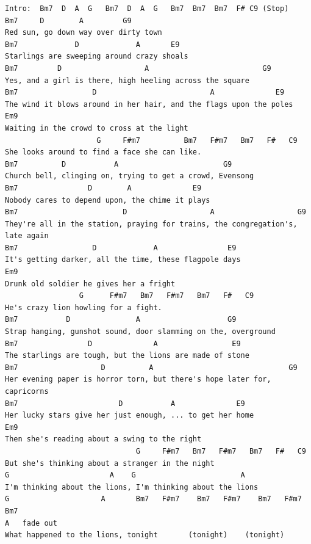 \documentclass[a4paper]{article}
\begin{document}
\begin{Verbatim}[commandchars=\\\{\}]
Intro:  Bm7  D  A  G   Bm7  D  A  G   Bm7  Bm7  Bm7  F# C9 (Stop) 
Bm7     D        A         G9 
Red sun, go down way over dirty town 
Bm7             D             A       E9 
Starlings are sweeping around crazy shoals 
Bm7         D                   A                          G9 
Yes, and a girl is there, high heeling across the square 
Bm7                 D                          A              E9 
The wind it blows around in her hair, and the flags upon the poles 
Em9 
Waiting in the crowd to cross at the light 
                     G     F#m7          Bm7   F#m7   Bm7   F#   C9 
She looks around to find a face she can like. 
Bm7          D           A                        G9 
Church bell, clinging on, trying to get a crowd, Evensong 
Bm7                D        A              E9 
Nobody cares to depend upon, the chime it plays 
Bm7                        D                   A                   G9 
They're all in the station, praying for trains, the congregation's, late again 
Bm7                 D             A                E9 
It's getting darker, all the time, these flagpole days 
Em9 
Drunk old soldier he gives her a fright 
                 G      F#m7   Bm7   F#m7   Bm7   F#   C9 
He's crazy lion howling for a fight. 
Bm7           D               A                    G9 
Strap hanging, gunshot sound, door slamming on the, overground 
Bm7                D              A                 E9 
The starlings are tough, but the lions are made of stone 
Bm7                   D          A                               G9 
Her evening paper is horror torn, but there's hope later for, capricorns 
Bm7                       D           A              E9 
Her lucky stars give her just enough, ... to get her home 
Em9 
Then she's reading about a swing to the right 
                              G     F#m7   Bm7   F#m7   Bm7   F#   C9 
But she's thinking about a stranger in the night 
G                       A    G                        A 
I'm thinking about the lions, I'm thinking about the lions 
G                     A       Bm7   F#m7    Bm7   F#m7    Bm7   F#m7    Bm7 
A   fade out 
What happened to the lions, tonight       (tonight)    (tonight) 
\end{Verbatim}
\newpage
\end{document}

